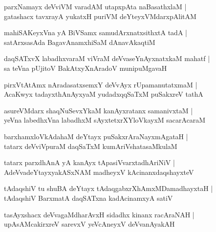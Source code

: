 \begin{shloka}
parxNamayx deVviVM varadAM utapxpAta naBasathxlaM |\\
gatashacx tavxrayA yukatxH puriVM deYteyxVMdarxpAlitAM
\end{shloka}

\begin{shloka}
mahiSAKeyxVna yA BiVSamx samudArxnatxsithxtA tadA |\\
satArxsasAda BagavAnamxhiSaM dAnavAkaqtiM 
\end{shloka}

\begin{shloka}
daqSATxvX labadhxvaraM viVraM deVvaseYnAyxnatxkaM mahatf |\\
sa teVna pUjitoV BakAtxyXnAradoV munipuMgavaH 
\end{shloka}

\begin{shloka}
pirxVtAtAmx nAradasatxsemxY deVvAyx rUpamanutatxmaM |\\
AcaKwyx tadayxthAnAyxyaM yudadxqqSaTxM puSakxreV tathA
\end{shloka}

\begin{shloka}
asureVMdarx shaqNuSevxYkaM kanAyxratanx samanivxtaM |\\
yeVna labedhxVna labadhxM sAyxtetxrXYloVkayxM sacarAcaraM 
\end{shloka}

\begin{shloka}
barxhamxloVkAdahaM deYtayx puSakxrAraNayxmAgataH |\\
tatarx deVviVpuraM daqSaTxM kumAriVshatasaMkulaM 
\end{shloka}

\begin{shloka}
tatarx parxdhAnA yA kanAyx tApasiVvarxtadhAriNiV |\\
AdeVvadeYtayxyakASxNAM madheyxV kAcinanxdaqshayxteV 
\end{shloka}

\begin{shloka}
tAdaqshiV tu shuBA deYtayx tAdaqgabxrXhAmxMDamadhayxtaH |\\
tAdaqshiV BarxmatA daqSATxna kadAcinamxyA satiV
\end{shloka}

\begin{shloka}
tasAyxshacx deVvagaMdharAvxH sidadhx kinanx racAraNAH |\\
upAsAMcakirxreV sarevxV yeVcAneyxV deVvanAyakAH 
\end{shloka}

